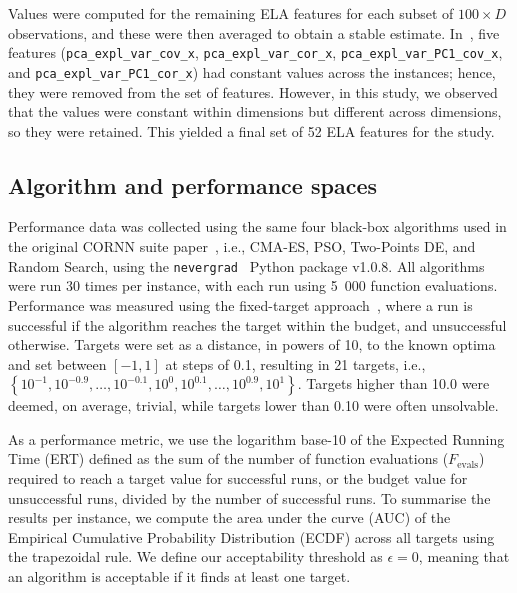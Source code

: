 \documentclass[acmsmall,screen,review,anonymous]{acmart}
\begin{document}
Values were computed for the remaining ELA features for each subset of $100\times D$ observations, and these were then averaged to obtain a stable estimate. In~\cite{Malan2025}, five features ({\tt pca\_expl\_var\_cov\_x}, {\tt pca\_expl\_var\_cor\_x}, {\tt pca\_expl\_var\_PC1\_cov\_x}, and {\tt pca\_expl\_var\_PC1\_cor\_x}) had constant values across the instances; hence, they were removed from the set of features. However, in this study, we observed that the values were constant within dimensions but different across dimensions, so they were retained. This yielded a final set of 52 ELA features for the study.

\subsection{Algorithm and performance spaces}\label{sec:alg_perf}
Performance data was collected using the same four black-box algorithms used in the original CORNN suite paper~\cite{Malan2022}, i.e., CMA-ES, PSO, Two-Points DE, and Random Search, using the \texttt{nevergrad}~\cite{nevergrad2018} Python package v1.0.8. All algorithms were run 30 times per instance, with each run using 5~000 function evaluations. Performance was measured using the fixed-target approach~\cite{hansen2021coco}, where a run is successful if the algorithm reaches the target within the budget, and unsuccessful otherwise. Targets were set as a distance, in powers of 10, to the known optima and set between $\left[-1,1\right]$ at steps of 0.1, resulting in 21 targets, i.e., $\left\{10^{-1}, 10^{-0.9},\ldots,10^{-0.1},10^{0},10^{0.1},\ldots,10^{0.9},10^1\right\}$. Targets higher than 10.0 were deemed, on average, trivial, while targets lower than 0.10 were often unsolvable.

As a performance metric, we use the logarithm base-10 of the Expected Running Time (ERT) defined as the sum of the number of function evaluations ($F_{\text{evals}}$) required to reach a target value for successful runs, or the budget value for unsuccessful runs, divided by the number of successful runs. To summarise the results per instance, we compute the area under the curve (AUC) of the Empirical Cumulative Probability Distribution (ECDF) across all targets using the trapezoidal rule. We define our acceptability threshold as $\epsilon=0$, meaning that an algorithm is acceptable if it finds at least one target.
\end{document}
